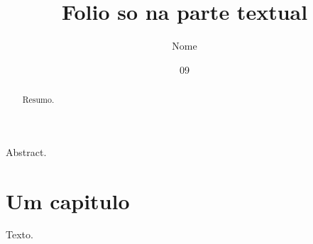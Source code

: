 \documentclass[dsc,rascunhoficha]{ufrj}
\title{Folio so na parte textual}
\author{Nome}{Sobrenome}
\date{09}{2026}
\begin{document}
  \maketitle
  \frontmatter
  \begin{abstract}Resumo.\end{abstract}
  \begin{foreignabstract}Abstract.\end{foreignabstract}
  \mainmatter
  \chapter{Um capitulo}
  Texto.
\end{document}
